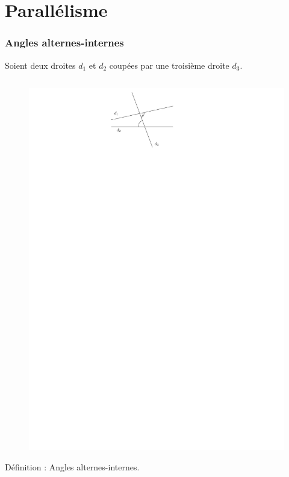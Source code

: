 \documentclass{beamer}
\begin{document}
\section{Parallélisme}

\frame{\tableofcontents[sectionstyle=show/shaded, subsectionstyle=show/shaded]}

\begin{frame}
  \frametitle{Angles alternes-internes}
  Soient deux droites $d_1$ et $d_2$ coupées par une troisième droite $d_3$.
  \begin{columns}[t]
    \begin{column}{5cm}
      \begin{figure}[H]
        \centering
        \includegraphics[width=0.6\linewidth]{5x10-angles/sources/ai-1.pdf}
      \end{figure}
      \begin{block}{Définition :}	
        Angles alternes-internes.
      \end{block}   


\end{column}
\end{columns}
\end{frame}
\end{document}
